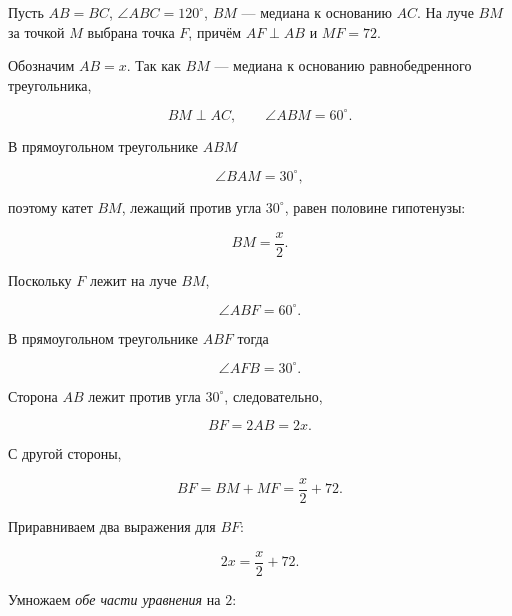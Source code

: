 \documentclass[a4paper,12pt]{article}
\begin{document}
Пусть $AB=BC$, $\angle ABC=120^\circ$, $BM$ --- медиана к основанию $AC$.
На луче $BM$ за точкой $M$ выбрана точка $F$, причём
$AF\perp AB$ и $MF=72$.

\begin{center}
\end{center}

Обозначим $AB=x$. Так как $BM$ --- медиана к основанию равнобедренного
треугольника,

\[
BM\perp AC,
\qquad
\angle ABM=60^\circ.
\]

В прямоугольном треугольнике $ABM$

\[
\angle BAM=30^\circ,
\]

поэтому катет $BM$, лежащий против угла $30^\circ$, равен половине
гипотенузы:

\[
BM=\frac{x}{2}.
\]

Поскольку $F$ лежит на луче $BM$,

\[
\angle ABF=60^\circ.
\]

В прямоугольном треугольнике $ABF$ тогда

\[
\angle AFB=30^\circ.
\]

Сторона $AB$ лежит против угла $30^\circ$, следовательно,

\[
BF=2AB=2x.
\]

С другой стороны,

\[
BF=BM+MF=\frac{x}{2}+72.
\]

Приравниваем два выражения для $BF$:

\[
2x=\frac{x}{2}+72.
\]

Умножаем \emph{обе части уравнения} на $2$:
\end{document}
